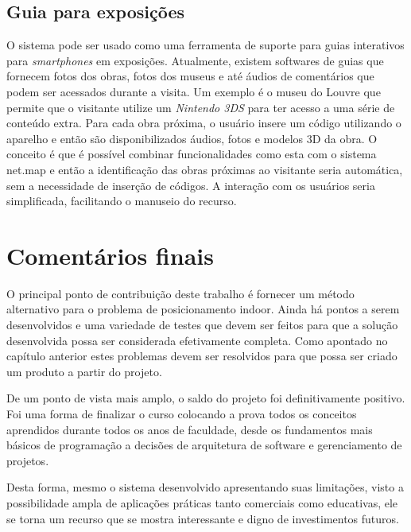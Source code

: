 \subsection{Guia para exposições}
O sistema pode ser usado como uma ferramenta de suporte para guias interativos para \textit{smartphones} em exposições. Atualmente, existem softwares de guias que fornecem fotos dos obras, fotos dos museus e até áudios de comentários que podem ser acessados durante a visita. Um exemplo é o museu do Louvre que permite que o visitante utilize um \textit{Nintendo 3DS} para ter acesso a uma série de conteúdo extra. Para cada obra próxima, o usuário insere um código utilizando o aparelho e então são disponibilizados áudios, fotos e modelos 3D da obra. O conceito é que é possível combinar funcionalidades como esta com o sistema net.map e então a identificação das obras próximas ao visitante seria automática, sem a necessidade de inserção de códigos. A interação com os usuários seria simplificada, facilitando o manuseio do recurso. 

\section{Comentários finais}

O principal ponto de contribuição deste trabalho é fornecer um método alternativo para o problema de posicionamento indoor. Ainda há pontos a serem desenvolvidos e uma variedade de testes que devem ser feitos para que a solução desenvolvida possa ser considerada efetivamente completa. Como apontado no capítulo anterior estes problemas devem ser resolvidos para que possa ser criado um produto a partir do projeto.\par
De um ponto de vista mais amplo, o saldo do projeto foi definitivamente positivo. Foi uma forma de finalizar o curso colocando a prova todos os conceitos aprendidos durante todos os anos de faculdade, desde os fundamentos mais básicos de programação a decisões de arquitetura de software e gerenciamento de projetos.\par
Desta forma, mesmo o sistema desenvolvido apresentando suas limitações, visto a possibilidade ampla de aplicações práticas tanto comerciais como educativas, ele se torna um recurso que se mostra interessante e digno de investimentos futuros.
